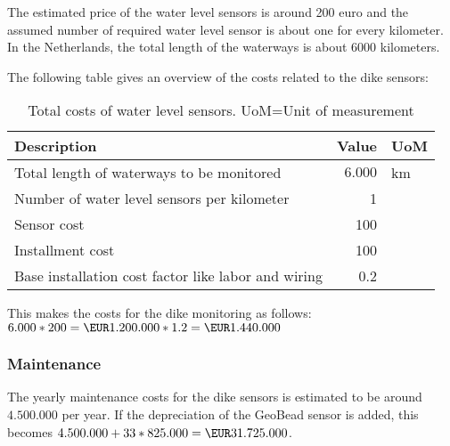 The estimated price of the water level sensors is around 200 euro and the assumed number of required water level sensor is about one for every kilometer. In the Netherlands, the total length of the waterways is about $6000$ kilometers\cite{cbs-waterways}.

The following table gives an overview of the costs related to the dike sensors:

\begin{table}[H]

	\centering
	\begin{tabular}{lrl}
	\toprule
	\textbf{Description} & \multicolumn{1}{l}{\textbf{Value}} & \textbf{UoM} \\ \hline
	Total length of waterways to be monitored & $6.000$ & km \\
	Number of water level sensors per kilometer & 1 & \\
	Sensor cost & 100 & \EUR{} \\
	Installment cost & 100 &\EUR{} \\
	Base installation cost factor like labor and wiring & 0.2 & \\
	\bottomrule
	\end{tabular}
	\label{table:total-dev-costs3} 
	\caption{Total costs of water level sensors. UoM=Unit of measurement}
\end{table}

This makes the costs for the dike monitoring as follows: \\
$ 6.000 * 200 = \EUR1.200.000 * 1.2 = \EUR1.440.000$\\

\subsubsection{Maintenance}


\newcommand{\installationCosts}{412.500.000}

The yearly maintenance costs for the dike sensors is estimated to be around \EUR$4.500.000$ per year. If the depreciation of the GeoBead sensor is added, this becomes $4.500.000 + 33*825.000 = \EUR31.725.000$. 

